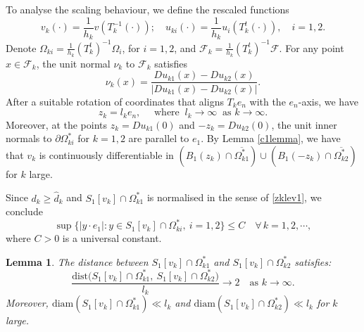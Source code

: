\documentclass[11pt]{amsart}
\theoremstyle{plain}
\newtheorem{lemma}{Lemma}[section]
\newcommand{\0}{\textbf{0}}
\numberwithin{equation}{section}
\numberwithin{equation}{section}
\numberwithin{figure}{section}
\begin{document}
To analyse the scaling behaviour, we define the rescaled functions
\[
v_k(\cdot) = \frac{1}{h_k} v\left(T_k^{-1}(\cdot)\right); \quad u_{ki}(\cdot) = \frac{1}{h_k} u_i\left(T_k^t(\cdot)\right), \quad i=1, 2.
\]
Denote \(\Omega_{ki} = \frac{1}{h_k}(T_k^t)^{-1}\Omega_i\), for \(i = 1, 2\), and \(\mathcal{F}_k = \frac{1}{h_k}(T_k^t)^{-1}\mathcal{F}\). 
For any point \(x \in \mathcal{F}_k\), the unit normal \(\nu_k\) to \(\mathcal{F}_k\) satisfies 
	\[ \nu_k(x) = \frac{Du_{k1}(x) - Du_{k2}(x)}{|Du_{k1}(x) - Du_{k2}(x)|}. \]  
After a suitable rotation of coordinates that aligns \(T_k e_n\) with the \(e_n\)-axis, we have 
	\begin{equation}\label{go2i}
		z_k = l_k e_n,\quad\text{ where }\ l_k \to \infty\ \text{ as } k \to \infty. 
	\end{equation}
Moreover, at the points \(z_k=Du_{k1}(0)\) and \(-z_k=Du_{k2}(0)\), the unit inner normals to \(\partial \Omega^*_{ki}\) for \(k = 1, 2\) are parallel to \(e_1\). 
By Lemma \ref{c1lemma}, we have that \( v_k \) is continuously differentiable in \( \left(B_1(z_k)\cap \overline{\Omega^*_{k1}}\right)\cup\left(B_1(-z_k)\cap \overline{\Omega^*_{k2}}\right) \) for \( k \) large.

Since \(d_k \geq \hat{d}_k  \) and $S_1[v_k]\cap\Omega^*_{k1}$ is normalised in the sense of \eqref{zklev1}, we conclude
	\begin{equation} \label{bde1}
		\sup\{ |y\cdot e_1| : y\in S_1[v_k]\cap\Omega^*_{ki}, \ i=1,2 \} \leq C \quad\forall\,k=1,2,\cdots, 
	\end{equation}
where $C>0$ is a universal constant. 
\begin{lemma}\label{limitdist}
The distance between \(S_1[v_k] \cap \Omega^*_{k1}\) and \(S_1[v_k] \cap \Omega^*_{k2}\) satisfies:
  \[
  \frac{\mathrm{dist}\big(S_1[v_k] \cap \Omega^*_{k1},\ S_1[v_k] \cap \Omega^*_{k2}\big)}{l_k} \rightarrow 2 \quad \text{as } k \rightarrow \infty.
  \]
  Moreover, \(\text{diam}\left(S_1[v_k] \cap \Omega^*_{k1}\right) \ll l_k\) and \(\text{diam}\left(S_1[v_k] \cap \Omega^*_{k2}\right) \ll l_k\) for \(k\) large.
\end{lemma}
\end{document}
